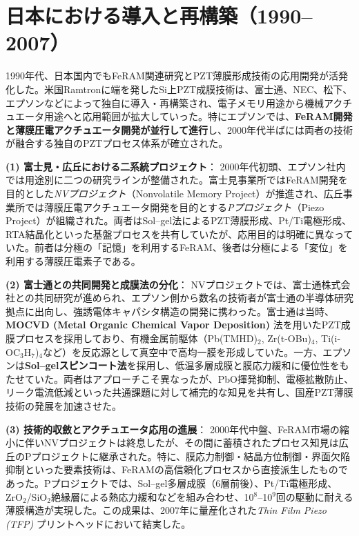 \documentclass[conference]{IEEEtran}
\begin{document}
\section{日本における導入と再構築（1990--2007）}
1990年代、日本国内でもFeRAM関連研究とPZT薄膜形成技術の応用開発が活発化した。米国Ramtronに端を発したSi上PZT成膜技術は、富士通、NEC、松下、エプソンなどによって独自に導入・再構築され、電子メモリ用途から機械アクチュエータ用途へと応用範囲が拡大していった。特にエプソンでは、\textbf{FeRAM開発と薄膜圧電アクチュエータ開発が並行して進行}し、2000年代半ばには両者の技術が融合する独自のPZTプロセス体系が確立された。

\medskip
\noindent
\textbf{(1) 富士見・広丘における二系統プロジェクト}：
2000年代初頭、エプソン社内では用途別に二つの研究ラインが整備された。富士見事業所ではFeRAM開発を目的とした\textit{NVプロジェクト}（Nonvolatile Memory Project）が推進され、広丘事業所では薄膜圧電アクチュエータ開発を目的とする\textit{Pプロジェクト}（Piezo Project）が組織された。両者はSol--gel法によるPZT薄膜形成、Pt/Ti電極形成、RTA結晶化といった基盤プロセスを共有していたが、応用目的は明確に異なっていた。前者は分極の「記憶」を利用するFeRAM、後者は分極による「変位」を利用する薄膜圧電素子である。

\medskip
\noindent
\textbf{(2) 富士通との共同開発と成膜法の分化}：
NVプロジェクトでは、富士通株式会社との共同研究が進められ、エプソン側から数名の技術者が富士通の半導体研究拠点に出向し、強誘電体キャパシタ構造の開発に携わった。富士通は当時、\textbf{MOCVD (Metal Organic Chemical Vapor Deposition)} 法を用いたPZT成膜プロセスを採用しており、有機金属前駆体（Pb(TMHD)$_2$, Zr(t-OBu)$_4$, Ti(i-OC$_3$H$_7$)$_4$など）を反応源として真空中で高均一膜を形成していた。一方、エプソンは\textbf{Sol--gelスピンコート法}を採用し、低温多層成膜と膜応力緩和に優位性をもたせていた。両者はアプローチこそ異なったが、PbO揮発抑制、電極拡散防止、リーク電流低減といった共通課題に対して補完的な知見を共有し、国産PZT薄膜技術の発展を加速させた。

\medskip
\noindent
\textbf{(3) 技術的収斂とアクチュエータ応用の進展}：
2000年代中盤、FeRAM市場の縮小に伴いNVプロジェクトは終息したが、その間に蓄積されたプロセス知見は広丘のPプロジェクトに継承された。特に、膜応力制御・結晶方位制御・界面欠陥抑制といった要素技術は、FeRAMの高信頼化プロセスから直接派生したものであった。Pプロジェクトでは、Sol--gel多層成膜（6層前後）、Pt/Ti電極形成、ZrO$_2$/SiO$_2$絶縁層による熱応力緩和などを組み合わせ、10$^8$--10$^9$回の駆動に耐える薄膜構造が実現した。この成果は、2007年に量産化された\textit{Thin Film Piezo (TFP)} プリントヘッドにおいて結実した。
\end{document}
